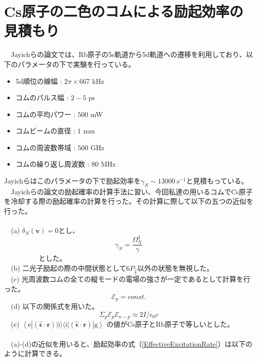 \documentclass[uplatex, dvipdfmx, a4paper, report, papersize, 11pt]{jsbook}
\begin{document}
\section{Cs原子の二色のコムによる励起効率の見積もり}
　Jayichらの論文\cite{PhysRevX.6.041004}では、Rb原子の5s軌道から5d軌道への遷移を利用しており、以下のパラメータの下で実験を行っている。
\begin{itemize}
  \item 5d順位の線幅 : $2\pi \times 667$ kHz
  \item コムのパルス幅 : $2-5$ ps
  \item コムの平均パワー : $500$ mW
  \item コムビームの直径 : $1$ mm
  \item コムの周波数帯域 : $500$ GHz
  \item コムの繰り返し周波数 : $80$ MHz
\end{itemize}
Jayichらはこのパラメータの下で励起効率を$\gamma_N \sim 13000\ \mathrm{s^{-1}}$と見積もっている。\\
　Jayichらの論文\cite{PhysRevX.6.041004}の励起確率の計算手法に習い、今回私達の用いるコムでCs原子を冷却する際の励起確率の計算を行った。その計算に際して以下の五つの近似を行った。\\
\\
　(a) $\delta_N(\bm{v}) = 0$とし、
\begin{equation}
  \gamma_N = \frac{\Omega^2_N}{\gamma}
\end{equation}
　　　　　とした。\\
　(b) 二光子励起の際の中間状態として$6P_{\frac{3}{2}}$以外の状態を無視した。\\
　(c) 光周波数コムの全ての縦モードの電場の強さが一定であるとして計算を行った。
\begin{equation}
  \mathcal{E}_p = const.
\end{equation}
　(d) 以下の関係式を用いた。
\begin{equation}
  \Sigma_{p} \mathcal{E}_p\mathcal{E}_{n-p} \approx 2I/\epsilon_0 c
\end{equation}
　(e) $\left\langle \mathrm { e } \left| ( \hat { \boldsymbol { \epsilon } } \cdot \mathbf { r } ) | \mathrm { i } \rangle \langle \mathrm { i } |  ( \hat { \boldsymbol { \epsilon } } \cdot \mathbf { r } ) \right| \mathrm { g } \right\rangle$ の値がCs原子とRb原子で等しいとした。\\
\\
　(a)-(d)の近似を用いると、励起効率の式（\ref{EffectiveExcitationRate}）は以下のように計算できる。\\
\end{document}
